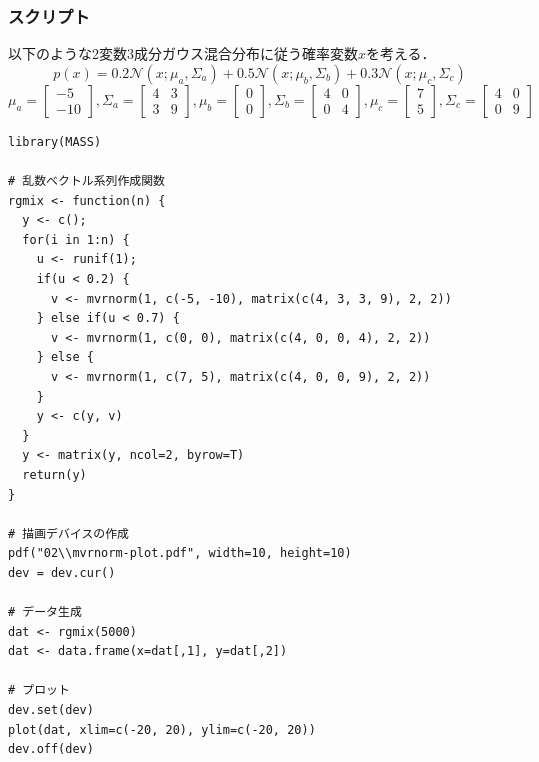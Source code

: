 \documentclass{jsarticle}
\begin{document}
\subsubsection*{スクリプト}
以下のような2変数3成分ガウス混合分布に従う確率変数$x$を考える．
\begin{equation}
	p(x)=
	0.2\mathcal{N}(x; \mu_a, \Sigma_a) + 
	0.5\mathcal{N}(x; \mu_b, \Sigma_b) + 
	0.3\mathcal{N}(x; \mu_c, \Sigma_c)
\end{equation}
\begin{equation}
	\mu_a = \left[
		\begin{array}{r}
			-5 \\
			-10
		\end{array}
	\right],
	\Sigma_a = \left[
		\begin{array}{rr}
			4 & 3 \\
			3 & 9
		\end{array}
	\right],
	\mu_b = \left[
		\begin{array}{r}
			0 \\
			0
		\end{array}
	\right],
	\Sigma_b = \left[
		\begin{array}{rr}
			4 & 0 \\
			0 & 4
		\end{array}
	\right],
	\mu_c = \left[
		\begin{array}{r}
			7 \\
			5
		\end{array}
	\right],
	\Sigma_c = \left[
		\begin{array}{rr}
			4 & 0 \\
			0 & 9
		\end{array}
	\right]
	\label{eqn:parameters}
\end{equation}

\begin{lstlisting}[basicstyle=\ttfamily\footnotesize, frame=single]
library(MASS)

# 乱数ベクトル系列作成関数
rgmix <- function(n) {
  y <- c();
  for(i in 1:n) {
    u <- runif(1);
    if(u < 0.2) {
      v <- mvrnorm(1, c(-5, -10), matrix(c(4, 3, 3, 9), 2, 2))
    } else if(u < 0.7) {
      v <- mvrnorm(1, c(0, 0), matrix(c(4, 0, 0, 4), 2, 2))
    } else {
      v <- mvrnorm(1, c(7, 5), matrix(c(4, 0, 0, 9), 2, 2))
    }
    y <- c(y, v)
  }
  y <- matrix(y, ncol=2, byrow=T)
  return(y)
}

# 描画デバイスの作成
pdf("02\\mvrnorm-plot.pdf", width=10, height=10)
dev = dev.cur()

# データ生成
dat <- rgmix(5000)
dat <- data.frame(x=dat[,1], y=dat[,2])

# プロット
dev.set(dev)
plot(dat, xlim=c(-20, 20), ylim=c(-20, 20))
dev.off(dev)
\end{lstlisting}
\end{document}
